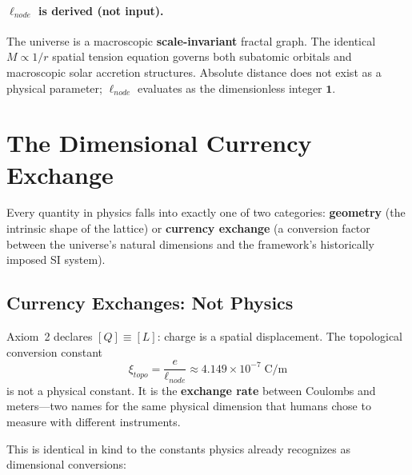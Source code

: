 \paragraph{$\ell_{node}$ is derived (not input).}
The universe is a macroscopic \textbf{scale-invariant} fractal graph.
The identical $M \propto 1/r$ spatial tension equation governs both subatomic
orbitals and macroscopic solar accretion structures. Absolute distance does not
exist as a physical parameter; $\ell_{node}$ evaluates as the dimensionless
integer $\mathbf{1}$.

\bigskip
\noindent
{}

\section{The Dimensional Currency Exchange}
\label{sec:currency_exchange}

Every quantity in physics falls into exactly one of two categories:
\textbf{geometry} (the intrinsic shape of the lattice) or
\textbf{currency exchange} (a conversion factor between the
universe's natural dimensions and the framework's historically imposed SI
system).

\subsection{Currency Exchanges: Not Physics}

Axiom~2 declares $[Q] \equiv [L]$: charge is a spatial
displacement.  The topological conversion constant
\begin{equation}
    \xi_{topo} = \frac{e}{\ell_{node}}
    \approx 4.149 \times 10^{-7}\;\text{C/m}
\end{equation}
is not a physical constant.  It is the \textbf{exchange rate} between
Coulombs and meters---two names for the same physical dimension
that humans chose to measure with different instruments.

This is identical in kind to the constants physics already recognizes
as dimensional conversions:

